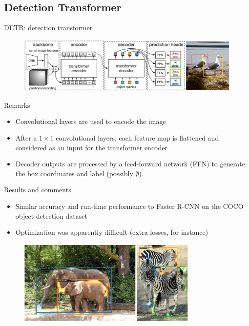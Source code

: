 \documentclass[xcolor=pdftex,dvipsnames,table,mathserif]{beamer}
\begin{document}
\subsection{Detection Transformer}

\begin{frame}{DETR: detection transformer~\cite{carion_end--end_2020}}

\begin{figure}[ht]
  \centering
  \includegraphics[width=\textwidth]{end_to_end_transformer}
\end{figure}


\begin{block}{Remarks}
  \begin{itemize}
  \item Convolutional layers are used to encode the image
  \item After a $1 \times 1$ convolutional layers, each feature map is flattened and considered as an input for the transformer encoder
  \item Decoder outputs are processed by a feed-forward network (FFN) to generate the box coordinates and label (possibly $\emptyset$).
  \end{itemize}
\end{block}

\end{frame}

\begin{frame}{Results and comments}

\begin{itemize}
\item Similar accuracy and run-time performance to Faster R-CNN on the COCO object detection dataset
\item Optimization was apparently difficult (extra losses, for instance)
\end{itemize}

\begin{figure}[ht]
  \centering
  \includegraphics[width=0.8\textwidth]{detr_attention_scores}
\end{figure}


\end{frame}
\end{document}
